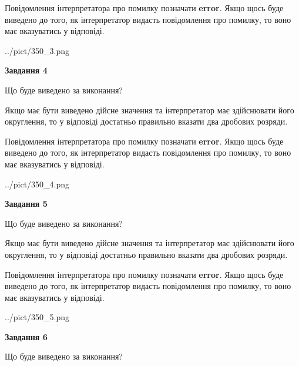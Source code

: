 \documentclass[12pt, ukrainian]{article}
\begin{document}
{\begin {Large}
Повідомлення інтерпретатора про помилку позначати \textbf{error}.
Якщо щось буде виведено до того, як інтерпретатор видасть повідомлення про помилку, 
то воно має вказуватись у відповіді. \par

\begin{center}
	{../pict/350_3.png}
\end{center}
\newpage

{\begin {center}\textbf{Завдання 4}\end {center}}\par
Що буде виведено за виконання? \par

Якщо має бути виведено дійсне значення та інтерпретатор має здійснювати його округлення, 
то у відповіді достатньо правильно вказати два дробових розряди.

Повідомлення інтерпретатора про помилку позначати \textbf{error}.
Якщо щось буде виведено до того, як інтерпретатор видасть повідомлення про помилку, 
то воно має вказуватись у відповіді. \par

\begin{center}
	{../pict/350_4.png}
\end{center}
\newpage

{\begin {center}\textbf{Завдання 5}\end {center}}\par
Що буде виведено за виконання? \par

Якщо має бути виведено дійсне значення та інтерпретатор має здійснювати його округлення, 
то у відповіді достатньо правильно вказати два дробових розряди.

Повідомлення інтерпретатора про помилку позначати \textbf{error}.
Якщо щось буде виведено до того, як інтерпретатор видасть повідомлення про помилку, 
то воно має вказуватись у відповіді. \par

\begin{center}
	{../pict/350_5.png}
\end{center}
\newpage

{\begin {center}\textbf{Завдання 6}\end {center}}\par
Що буде виведено за виконання? \par


\end{Large}}
\end{document}

